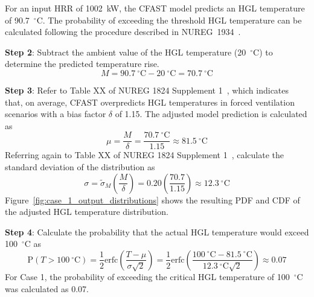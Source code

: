 \documentclass[12pt]{article}
\begin{document}
For an input HRR of 1002~kW, the CFAST model predicts an HGL temperature of 90.7~$^\circ$C. The probability of exceeding the threshold HGL temperature can be calculated following the procedure described in NUREG~1934~\cite{NUREG_1934}.

\textbf{Step 2}: Subtract the ambient value of the HGL temperature (20~$^\circ$C) to determine the predicted temperature rise.
\begin{equation}
M = 90.7~^\circ\textrm{C} - 20~^\circ\textrm{C} = 70.7~^\circ\textrm{C}
\end{equation}

\textbf{Step 3}: Refer to Table XX of NUREG 1824 Supplement 1~\cite{NUREG_1824_Sup_1}, which indicates that, on average, CFAST overpredicts HGL temperatures in forced ventilation scenarios with a bias factor $\delta$ of 1.15. The adjusted model prediction is calculated as
\begin{equation}
\mu = \frac{M}{\delta} = \frac{70.7~^\circ\textrm{C}}{1.15} \approx 81.5~^\circ\textrm{C}
\end{equation}
Referring again to Table XX of NUREG 1824 Supplement 1~\cite{NUREG_1824_Sup_1}, calculate the standard deviation of the distribution as
\begin{equation}
\sigma = \widetilde\sigma_M \left( \frac{M}{\delta} \right) = 0.20 \left( \frac{70.7}{1.15} \right) \approx 12.3~^\circ\textrm{C}
\end{equation}
Figure~\ref{fig:case_1_output_distributions} shows the resulting PDF and CDF of the adjusted HGL temperature distribution.

\textbf{Step 4}: Calculate the probability that the actual HGL temperature would exceed 100~$^\circ$C as
\begin{equation}
\textrm{P}(T > 100~^\circ\textrm{C}) = \frac{1}{2} \textrm{erfc} \left( \frac{T - \mu}{\sigma \sqrt{2}} \right) = \frac{1}{2} \textrm{erfc} \left( \frac{100~^\circ\textrm{C} - 81.5~^\circ\textrm{C}}{12.3~^\circ\textrm{C} \sqrt{2}} \right) \approx 0.07
\end{equation}
For Case 1, the probability of exceeding the critical HGL temperature of 100~$^\circ$C was calculated as 0.07.


\clearpage
\end{document}
